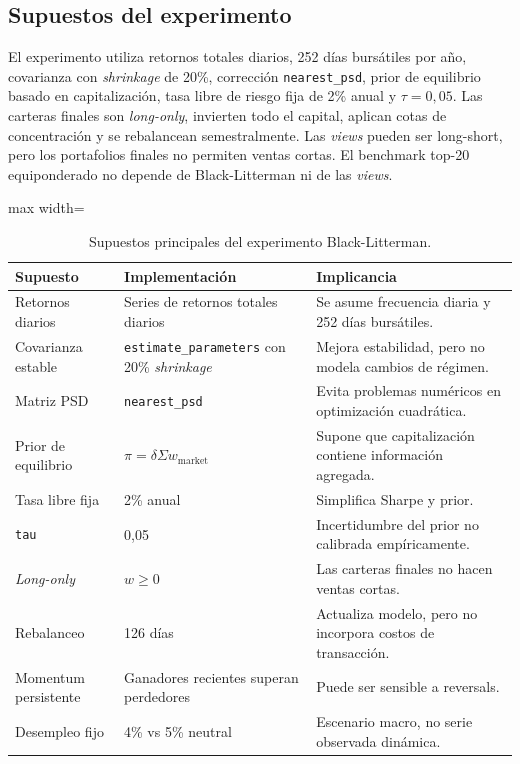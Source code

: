 \subsection*{Supuestos del experimento}

El experimento utiliza retornos totales diarios, 252 d\'ias burs\'atiles por
a\~no, covarianza con \textit{shrinkage} de 20\%, correcci\'on
\texttt{nearest\_psd}, prior de equilibrio basado en capitalizaci\'on, tasa libre
de riesgo fija de 2\% anual y $\tau = 0,05$. Las carteras finales son
\textit{long-only}, invierten todo el capital, aplican cotas de concentraci\'on y
se rebalancean semestralmente. Las \textit{views} pueden ser long-short, pero
los portafolios finales no permiten ventas cortas. El benchmark top-20
equiponderado no depende de Black-Litterman ni de las \textit{views}.

\begin{table}[H]
\centering
\caption{Supuestos principales del experimento Black-Litterman.}
\label{tab:anexo4_bl_supuestos}
\small
\begin{adjustbox}{max width=\textwidth}
\begin{tabular}{@{}p{}p{}p{}@{}}
\toprule
Supuesto & Implementaci\'on & Implicancia \\
\midrule
Retornos diarios & Series de retornos totales diarios & Se asume frecuencia diaria y 252 d\'ias burs\'atiles. \\
Covarianza estable & \texttt{estimate\_parameters} con 20\% \textit{shrinkage} & Mejora estabilidad, pero no modela cambios de r\'egimen. \\
Matriz PSD & \texttt{nearest\_psd} & Evita problemas num\'ericos en optimizaci\'on cuadr\'atica. \\
Prior de equilibrio & $\pi = \delta\Sigma w_{\text{market}}$ & Supone que capitalizaci\'on contiene informaci\'on agregada. \\
Tasa libre fija & 2\% anual & Simplifica Sharpe y prior. \\
\texttt{tau} & 0,05 & Incertidumbre del prior no calibrada emp\'iricamente. \\
\textit{Long-only} & $w \geq 0$ & Las carteras finales no hacen ventas cortas. \\
Rebalanceo & 126 d\'ias & Actualiza modelo, pero no incorpora costos de transacci\'on. \\
Momentum persistente & Ganadores recientes superan perdedores & Puede ser sensible a reversals. \\
Desempleo fijo & 4\% vs 5\% neutral & Escenario macro, no serie observada din\'amica. \\
\bottomrule
\end{tabular}
\end{adjustbox}
\end{table}

